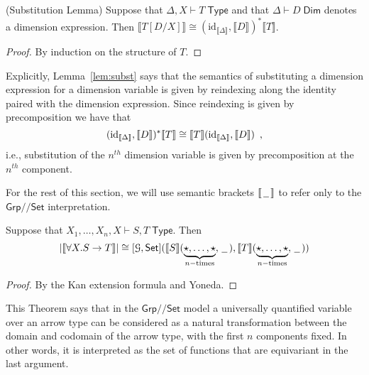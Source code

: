 \documentclass[a4paper,UKenglish]{lipics}
\theoremstyle{plain}
\newcommand{\msf}[1]{\mathsf{#1}} %
\newcommand{\Grp}{\msf{Grp}}
\newcommand{\Set}{\msf{Set}}
\newcommand{\blank}{\, \underline{\hspace{2mm}} \,}
\newcommand{\GroupSet}[1]{[#1,\Set]}
\newcommand{\Lslice}[1]{#1/\!/\Set}
\newcommand{\GrpSet}{\Lslice{\Grp}}
\newcommand{\sem}[1]{\ensuremath{\llbracket #1 \rrbracket}}
\newcommand{\Dj}[2]{#1 \vdash #2 \; \msf{ Dim}}
\newcommand{\Dim}{D}
\newcommand{\id}{\mathrm{id}}
\begin{document}
\begin{lemma}(Substitution Lemma)
\label{lem:subst}
Suppose that $\Delta, X \vdash T \; \msf{ Type}$ and that $\Dj\Delta \Dim$ denotes a dimension expression. Then $\sem{T[D/X]} \cong (\id_{\sem{\Delta}} , \sem{D})^\ast \sem{T}$.
\end{lemma}
\begin{proof}
 By induction on the structure of $T$.
\end{proof}


Explicitly, Lemma~\ref{lem:subst} says that the semantics of substituting a dimension expression for a dimension variable is given by reindexing along the identity paired with the dimension expression. Since reindexing is given by precomposition we have that
\[
 (\id_{\sem{\Delta}} , \sem{D})^\ast \sem{T} \cong \sem{T}(\id_{\sem{\Delta}}, \sem{D}) \enspace \text,
\]
i.e., substitution of the $n^{th}$ dimension variable is given by precomposition at the $n^{th}$ component.

For the rest of this section, we will use semantic brackets $\sem{\, \underline{\hspace{2mm}}\, }$ to refer only to the $\GrpSet$ interpretation.

\begin{theorem}
\label{thm:allArrows}
 Suppose that $X_1, \ldots, X_n, X \vdash S,T \; \msf{ Type}$. Then
\[
|\sem{\forall X. S \rightarrow T}| \cong \GroupSet{\mathcal{G}} (\sem{S}(\underbrace{\star,\ldots,\star}_{n-\text{times}}, \blank),\sem{T}(\underbrace{\star,\ldots,\star}_{n-\text{times}}, \blank))
\]
\end{theorem}
\begin{proof}
By the Kan extension formula and Yoneda.
\end{proof}

This Theorem says that in the $\GrpSet$ model a universally quantified variable over an arrow type can be considered as a natural transformation between the domain and codomain of the arrow type, with the first $n$ components fixed.
In other words, it is interpreted as the set of functions that are equivariant
in the last argument.
\end{document}
